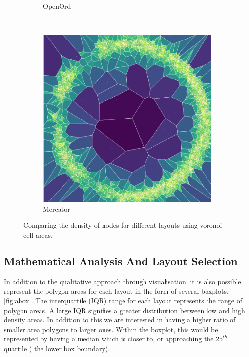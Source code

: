 \begin{figure}[H]
\begin{subfigure}[b]{.49\textwidth}
         \caption{OpenOrd}
         \label{fig:aoo}
     \end{subfigure}\\
     \begin{subfigure}[b]{.49\textwidth}
         \centering \includegraphics[width=\textwidth,angle=0]{figures_c1/area/fill_mercloc.png}
         \caption{Mercator}
         \label{fig:amer}
     \end{subfigure}

        \caption{Comparing the density of nodes for different layouts using voronoi cell areas.}
        \label{fig:vornoicompare}
\end{figure}

\subsection{Mathematical Analysis And Layout Selection}
In addition to the qualitative approach through visualisation, it is also possible represent the polygon areas for each layout in the form of several boxplots, \autoref{fig:abox}. The interquartile (IQR) range for each layout represents the range of polygon areas. A large IQR signifies a greater distribution between low and high density  areas. 
In addition to this we are interested in having a higher ratio of smaller area polygons to larger ones. Within the boxplot, this would be represented by having a median which is closer to, or approaching the $25^{th}$ quartile ( the lower box boundary).


